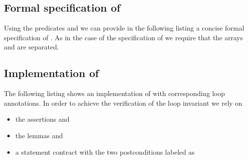 \subsection{Formal specification of \adjacentdifference}

Using the predicates  and 
we can provide in the following listing a concise formal specification of \adjacentdifference.
As in the case of the specification of 
we require that the arrays  and  
are separated.



\clearpage

\subsection{Implementation of \adjacentdifference}

The following listing shows an implementation of \adjacentdifference
with corresponding loop annotations.
In order to achieve the verification of the loop invariant  we 
rely on
\begin{itemize}
\item the assertions  and 
\item the lemmas  and 
\item a statement contract with the two postconditions labeled as 
\end{itemize}



\clearpage

